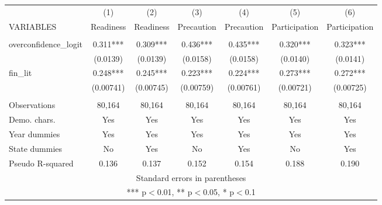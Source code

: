 \documentclass[]{article}
\begin{document}
\begin{tabular}{lcccccc} \hline
 & (1) & (2) & (3) & (4) & (5) & (6) \\
VARIABLES & Readiness & Readiness & Precaution & Precaution & Participation & Participation \\ \hline
 &  &  &  &  &  &  \\
overconfidence\_logit & 0.311*** & 0.309*** & 0.436*** & 0.435*** & 0.320*** & 0.323*** \\
 & (0.0139) & (0.0139) & (0.0158) & (0.0158) & (0.0140) & (0.0141) \\
fin\_lit & 0.248*** & 0.245*** & 0.223*** & 0.224*** & 0.273*** & 0.272*** \\
 & (0.00741) & (0.00745) & (0.00759) & (0.00761) & (0.00721) & (0.00725) \\
 &  &  &  &  &  &  \\
Observations & 80,164 & 80,164 & 80,164 & 80,164 & 80,164 & 80,164 \\
Demo. chars. & Yes & Yes & Yes & Yes & Yes & Yes \\
Year dummies & Yes & Yes & Yes & Yes & Yes & Yes \\
State dummies & No & Yes & No & Yes & No & Yes \\
 Pseudo R-squared & 0.136 & 0.137 & 0.152 & 0.154 & 0.188 & 0.190 \\ \hline
\multicolumn{7}{c}{ Standard errors in parentheses} \\
\multicolumn{7}{c}{ *** p$<$0.01, ** p$<$0.05, * p$<$0.1} \\
\end{tabular}
\end{document}
